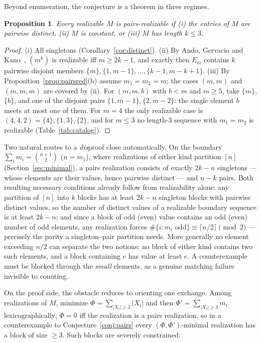 \documentclass[11pt]{article}
\newtheorem{proposition}[theorem]{Proposition}
\theoremstyle{definition}
\theoremstyle{remark}
\newcommand{\intv}[1]{[#1]}
\begin{document}
Beyond enumeration, the conjecture is a theorem in three regimes.

\begin{proposition}\label{prop:pairsspecial}
Every realizable $M$ is pairs-realizable if (i) the entries of $M$ are
pairwise distinct, (ii) $M$ is constant, or (iii) $M$ has length $k\le3$.
\end{proposition}

\begin{proof}
(i) All singletons (Corollary~\ref{cor:distinct}). (ii) By Ando, Gervacio
and Kano~\cite{AndoGervacioKano90}, $(m^{k})$ is realizable iff $m\ge2k-1$,
and exactly then $E_m$ contains $k$ pairwise disjoint members
$\{m\},\{1,m-1\},\dots,\{k-1,m-k+1\}$. (iii) By
Proposition~\ref{prop:pairsred}(b) assume $m_1=m_2=m$; the cases $(m,m)$ and
$(m,m,m)$ are covered by (ii). For $(m,m,b)$ with $b<m$ and $m\ge5$, take
$\{m\}$, $\{b\}$, and one of the disjoint pairs $\{1,m-1\},\{2,m-2\}$: the
single element $b$ meets at most one of them. For $m=4$ the only realizable
case is $(4,4,2)=\{4\},\{1,3\},\{2\}$, and for $m\le3$ no length-$3$
sequence with $m_1=m_2$ is realizable (Table~\ref{tab:catalog}).
\end{proof}

Two natural routes to a \emph{dis}proof close automatically. On the boundary
$\sum_im_i=\binom{n+1}{2}$ ($n=m_1$), where realizations of either kind
partition $\intv n$ (Section~\ref{sec:minimal}), a pairs realization
consists of exactly $2k-n$ singletons --- whose elements are their values,
hence pairwise distinct --- and $n-k$ pairs. Both resulting necessary
conditions already follow from realizability alone: any partition of
$\intv n$ into $k$ blocks has at least $2k-n$ singleton blocks with
pairwise distinct values, so the number of distinct values of a realizable
boundary sequence is at least $2k-n$; and since a block of odd (even) value
contains an odd (even) number of odd elements, any realization forces
$\#\{i:m_i\text{ odd}\}\equiv\lceil n/2\rceil\pmod2$ --- precisely the
parity a singleton--pair partition needs. More generally no element
exceeding $n/2$ can separate the two notions: no block of either kind
contains two such elements, and a block containing $e$ has value at least
$e$. A counterexample must be blocked through the \emph{small} elements, as
a genuine matching failure invisible to counting.

On the proof side, the obstacle reduces to orienting one exchange. Among
realizations of $M$, minimize $\Phi=\sum_{|X_i|\ge3}|X_i|$ and then
$\Phi'=\sum_{|X_i|\ge3}m_i$ lexicographically; $\Phi=0$ iff the realization is
a pairs realization, so in a counterexample to Conjecture~\ref{conj:pairs}
every $(\Phi,\Phi')$-minimal realization has a block of size $\ge3$. Such
blocks are severely constrained:
\end{document}
